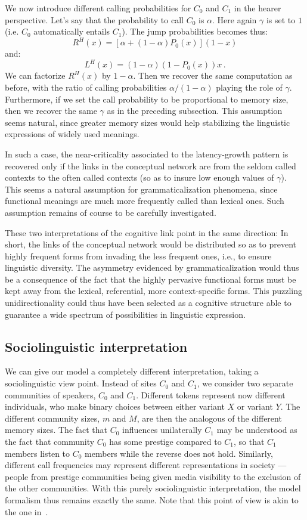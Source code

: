 \documentclass[12pt,twocolumn,amsmath,amssymb,aps,longbibliography]{revtex4-1}  %
\newcommand{\beq}{\begin{equation}}
\newcommand{\eneq}{\end{equation}}
\begin{document}
We now introduce different calling probabilities for $C_0$ and $C_1$ in the hearer perspective. Let's say that the probability to call $C_0$ is $\alpha$. Here again $\gamma$ is set to $1$ (i.e. $C_0$ automatically entails $C_1$). The jump probabilities becomes thus:
\beq
R^H(x) = \left[ \alpha + (1 - \alpha) P_0(x) \right] (1 -x)
\eneq
and:
\beq
L^H(x) = (1 - \alpha) (1 - P_0(x) ) x \, . 
\eneq
We can factorize $R^H(x)$ by $1 - \alpha$. Then we recover the same computation as before, with the ratio of calling probabilities $\alpha / (1- \alpha)$ playing the role of $\gamma$. Furthermore, if we set the call probability to be proportional to memory size, then we recover the same $\gamma $ as in the preceding subsection. This assumption seems natural, since greater memory sizes would help stabilizing the linguistic expressions of widely used meanings. 

In such a case, the near-criticality associated to the latency-growth pattern is recovered only if the links in the conceptual network are from the seldom called contexts to the often called contexts (so as to insure low enough values of $\gamma$). This seems a natural assumption for grammaticalization phenomena, since functional meanings are much more frequently called than lexical ones. Such assumption remains of course to be carefully investigated. 

These two interpretations of the cognitive link point in the same direction: In short, the links of the conceptual network would be distributed so as to prevent highly frequent forms from invading the less frequent ones, i.e., to ensure linguistic diversity. The asymmetry evidenced by grammaticalization would thus be a consequence of the fact that the highly pervasive functional forms must be kept away from the lexical, referential, more context-specific forms. This puzzling unidirectionality could thus have been selected as a cognitive structure able to guarantee a wide spectrum of possibilities in linguistic expression. 

\subsection{Sociolinguistic interpretation \label{socio_interpretation}} 

We can give our model a completely different interpretation, taking a sociolinguistic view point. Instead of sites $C_0$ and $C_1$, we consider two separate communities of speakers, $C_0$ and $C_1$. Different tokens represent now different individuals, who make binary choices between either variant $X$ or variant $Y$. The different community sizes, $m$ and $M$, are then the analogous of the different memory sizes. The fact that $C_0$ influences unilaterally $C_1$ may be understood as the fact that community $C_0$ has some prestige compared to $C_1$, so that $C_1$ members listen to $C_0$ members while the reverse does not hold. Similarly, different call frequencies may represent different representations in society --- people from prestige communities being given media visibility to the exclusion of the other communities. With this purely sociolinguistic interpretation, the model formalism thus remains exactly the same. Note that this point of view is akin to the one in~\cite{blythe2012s}. 
\end{document}
